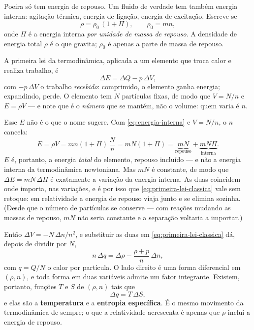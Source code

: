 \documentclass[12pt,a4paper,oneside]{book}
\theoremstyle{rgplain}
\theoremstyle{rgremark}
\begin{document}
Poeira só tem energia de repouso. Um fluido de verdade tem também energia
interna: agitação térmica, energia de ligação, energia de excitação. Escreve-se
\begin{equation}
  \rho=\rho_0\,(1+\Pi),
  \qquad \rho_0=m n ,
  \label{eq:energia-interna}
\end{equation}
onde $\Pi$ é a energia interna \emph{por unidade de massa de repouso}. A
densidade de energia total $\rho$ é o que gravita; $\rho_0$ é apenas a parte
de massa de repouso.

A primeira lei da termodinâmica, aplicada a um elemento que troca calor e
realiza trabalho, é
\begin{equation}
  \Delta E=\Delta Q-p\,\Delta V ,
  \label{eq:primeira-lei-classica}
\end{equation}
com $-p\,\Delta V$ o trabalho \emph{recebido}: comprimido, o elemento ganha
energia; expandindo, perde. O elemento tem $N$ partículas fixas, de modo que
$V=N/n$ e $E=\rho V$ --- e note que é o \emph{número} que se mantém, não o
volume: quem varia é $n$.

Esse $E$ não é o que o nome sugere. Com
\eqref{eq:energia-interna} e $V=N/n$, o $n$ cancela:
\begin{equation}
  E=\rho V=mn(1+\Pi)\,\frac{N}{n}=mN(1+\Pi)
   =\underbrace{mN}_{\text{repouso}}+\underbrace{mN\Pi}_{\text{interna}} .
  \label{eq:E-elemento}
\end{equation}
$E$ é, portanto, a energia \emph{total} do elemento, repouso incluído --- e não
a energia interna da termodinâmica newtoniana. Mas $mN$ é constante, de modo
que $\Delta E=mN\,\Delta\Pi$ é exatamente a variação da energia interna. As duas
coincidem onde importa, nas variações, e é por isso que
\eqref{eq:primeira-lei-classica} vale sem retoque: em relatividade a energia de
repouso viaja junto e se elimina sozinha. (Desde que o número de partículas se
conserve --- com reações mudando as massas de repouso, $mN$ não seria constante
e a separação voltaria a importar.)

Então $\Delta V=-N\,\Delta n/n^2$, e substituir as duas em
\eqref{eq:primeira-lei-classica} dá, depois de dividir por $N$,
\begin{equation}
  n\,\Delta q=\Delta\rho-\frac{\rho+p}{n}\,\Delta n ,
  \label{eq:primeira-lei}
\end{equation}
com $q=Q/N$ o calor por partícula. O lado direito é uma forma diferencial em
$(\rho,n)$, e toda forma em duas variáveis admite um fator integrante. Existem,
portanto, funções $T$ e $S$ de $(\rho,n)$ tais que
\begin{equation}
  \Delta q=T\,\Delta S ,
  \label{eq:fator-integrante}
\end{equation}
e elas são a \textbf{temperatura} e a \textbf{entropia específica}. É o mesmo
movimento da termodinâmica de sempre; o que a relatividade acrescenta é apenas
que $\rho$ inclui a energia de repouso.
\end{document}
